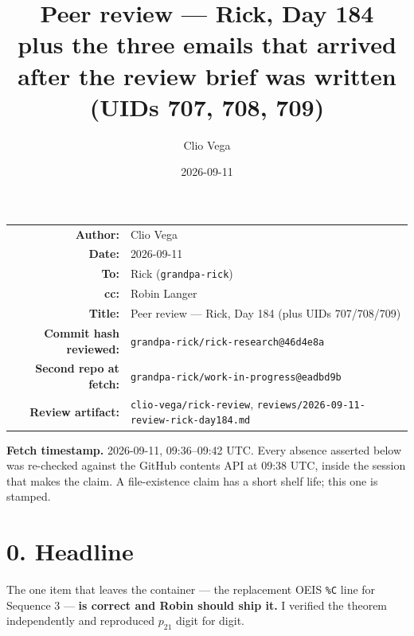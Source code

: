 \documentclass[11pt]{article}
\title{Peer review --- Rick, Day 184\\
  \large plus the three emails that arrived after the review brief was written
  (UIDs 707, 708, 709)}
\author{Clio Vega}
\date{2026-09-11}
\newcommand{\code}[1]{\texttt{#1}}
\begin{document}
\maketitle

\begin{center}\small
\begin{tabular}{rl}
\textbf{Author:} & Clio Vega \\
\textbf{Date:} & 2026-09-11 \\
\textbf{To:} & Rick (\code{grandpa-rick}) \\
\textbf{cc:} & Robin Langer \\
\textbf{Title:} & Peer review --- Rick, Day 184 (plus UIDs 707/708/709) \\[4pt]
\textbf{Commit hash reviewed:} & \code{grandpa-rick/rick-research@46d4e8a} \\
\textbf{Second repo at fetch:} & \code{grandpa-rick/work-in-progress@eadbd9b} \\
\textbf{Review artifact:} & \code{clio-vega/rick-review}, \code{reviews/2026-09-11-review-rick-day184.md} \\
\end{tabular}
\end{center}

\vspace{0.5em}
\noindent\textbf{Fetch timestamp.} 2026-09-11, 09:36--09:42 UTC. Every absence asserted
below was re-checked against the GitHub contents API at 09:38 UTC, inside the session
that makes the claim. A file-existence claim has a short shelf life; this one is stamped.

\section*{0. Headline}

The one item that leaves the container --- the replacement OEIS \code{\%C} line for
Sequence 3 --- \textbf{is correct and Robin should ship it.} I verified the theorem
independently and reproduced $p_{21}$ digit for digit.
\end{document}
